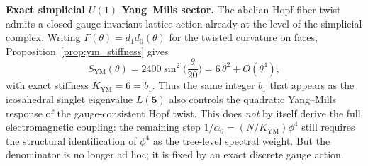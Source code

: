 \documentclass[12pt,a4paper]{article}
\theoremstyle{definition}
\begin{document}
\textbf{Exact simplicial $U(1)$ Yang--Mills sector.}  The abelian Hopf-fiber twist admits a closed gauge-invariant lattice action already at the level of the simplicial complex.  Writing $F(\theta)=d_1d_0(\theta)$ for the twisted curvature on faces, Proposition~\ref{prop:ym_stiffness} gives
\begin{equation}
S_{\mathrm{YM}}(\theta)=2400\sin^2\!\Big(\frac{\theta}{20}\Big)
= 6\,\theta^2 + O(\theta^4),
\end{equation}
with exact stiffness $K_{\mathrm{YM}} = 6 = b_1$.  Thus the same integer $b_1$ that appears as the icosahedral singlet eigenvalue $L(\mathbf{5})$ also controls the quadratic Yang--Mills response of the gauge-consistent Hopf twist.  This does \emph{not} by itself derive the full electromagnetic coupling: the remaining step $1/\alpha_0 = (N/K_{\mathrm{YM}})\phi^4$ still requires the structural identification of $\phi^4$ as the tree-level spectral weight.  But the denominator is no longer ad hoc; it is fixed by an exact discrete gauge action.
\end{document}
